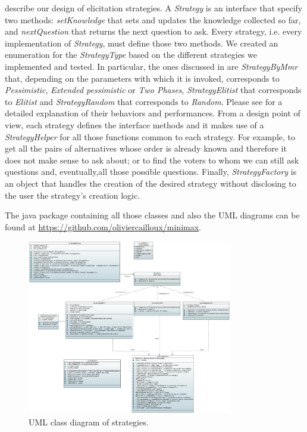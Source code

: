  describe our design of elicitation strategies. A \textit{Strategy} is an interface that specify two methods: \textit{setKnowledge} that sets and updates the knowledge collected so far, and \textit{nextQuestion} that returns the next question to ask. Every strategy, i.e. every implementation of \textit{Strategy}, must define those two methods. We created an enumeration for the \textit{StrategyType} based on the different strategies we implemented and tested.
In particular, the ones discussed in  are \textit{StrategyByMmr} that, depending on the parameters with which it is invoked, corresponds to \textit{Pessimistic}, \textit{Extended pessimistic} or \textit{Two Phases}, \textit{StrategyElitist} that corresponds to \textit{Elitist} and \textit{StrategyRandom} that corresponds to \textit{Random}.
Please see  for a detailed explanation of their behaviors and performances.
From a design point of view, each strategy defines the interface methods and it makes use of a \textit{StrategyHelper} for all those functions common to each strategy. For example, to get all the pairs of alternatives whose order is already known and therefore it does not make sense to ask about; or to find the voters to whom we can still ask questions and, eventually,all those possible questions.
Finally, \textit{StrategyFactory} is an object that handles the creation of the desired strategy without disclosing to the user the strategy's creation logic.

The java package containing all those classes and also the UML diagrams can be found at \url{https://github.com/oliviercailloux/minimax}.

\begin{figure}
	\centering
	\includegraphics[width=0.8\textwidth]{uml/strategies.jpeg}
	\caption{UML class diagram of strategies.}
	\label{uml:strategies}
\end{figure}
